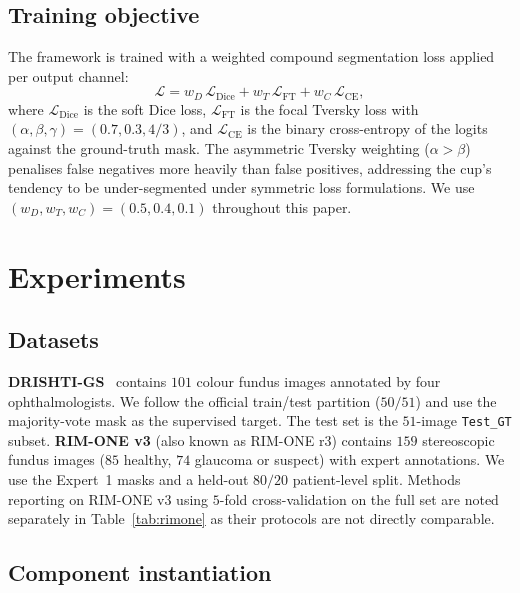 \documentclass[10pt,journal,twocolumn]{IEEEtran}
\begin{document}
\subsection{Training objective}

The framework is trained with a weighted compound segmentation loss applied per output channel:
\begin{equation}
\mathcal{L} = w_D\,\mathcal{L}_\text{Dice} + w_T\,\mathcal{L}_\text{FT} + w_C\,\mathcal{L}_\text{CE},
\label{eq:loss}
\end{equation}
where $\mathcal{L}_\text{Dice}$ is the soft Dice loss, $\mathcal{L}_\text{FT}$ is the focal Tversky loss with $(\alpha, \beta, \gamma) = (0.7, 0.3, 4/3)$, and $\mathcal{L}_\text{CE}$ is the binary cross-entropy of the logits against the ground-truth mask. The asymmetric Tversky weighting ($\alpha > \beta$) penalises false negatives more heavily than false positives, addressing the cup's tendency to be under-segmented under symmetric loss formulations. We use $(w_D, w_T, w_C) = (0.5, 0.4, 0.1)$ throughout this paper.

\section{Experiments}
\label{sec:experiments}

\subsection{Datasets}

\textbf{DRISHTI-GS}~\cite{sivaswamy2014drishti} contains $101$ colour fundus images annotated by four ophthalmologists. We follow the official train/test partition ($50/51$) and use the majority-vote mask as the supervised target. The test set is the $51$-image \texttt{Test\_GT} subset.
\textbf{RIM-ONE v3} (also known as RIM-ONE r3) contains $159$ stereoscopic fundus images ($85$ healthy, $74$ glaucoma or suspect) with expert annotations. We use the Expert~1 masks and a held-out $80/20$ patient-level split. Methods reporting on RIM-ONE v3 using $5$-fold cross-validation on the full set are noted separately in Table~\ref{tab:rimone} as their protocols are not directly comparable.

\subsection{Component instantiation}
\end{document}
